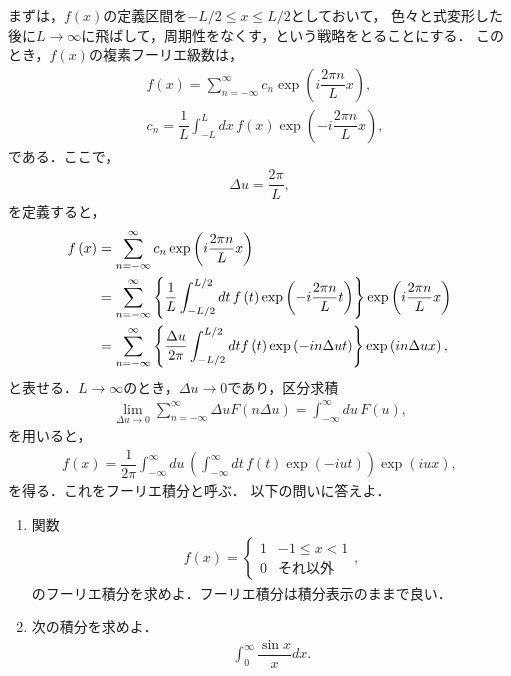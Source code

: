 まずは，$f(x)$の定義区間を$-L/2\leq x \leq L/2$としておいて，
色々と式変形した後に$L\to \infty$に飛ばして，周期性をなくす，という戦略をとることにする．
このとき，$f(x)$の複素フーリエ級数は，
\begin{align}
  &f\left(x\right) = \sum_{n=-\infty}^{\infty}c_n \exp\left(i\dfrac{2\pi n}{L}x\right), \\
  &c_n = \dfrac{1}{L}\int_{-L}^{L}dx\,f\left(x\right)\exp\left(-i\dfrac{2\pi n}{L}x\right),
\end{align}
である．ここで，
\begin{align}
  \Delta u = \dfrac{2\pi}{L},
\end{align}
を定義すると，
\begin{align}
 f\left(x\right) &= \sum_{n=-\infty}^{\infty}c_n \exp\left(i\dfrac{2\pi n}{L}x\right) \notag \\
                 &= \sum_{n=-\infty}^{\infty}\left\{\dfrac{1}{L}\int_{-L/2}^{L/2}dt\, f\left(t\right)
                             \exp\left(-i\dfrac{2\pi n}{L}t\right)\right\}\exp\left(i\dfrac{2\pi n}{L}x\right) \notag \\
                 &= \sum_{n=-\infty}^{\infty}\left\{\dfrac{\Delta u}{2\pi}\int_{-L/2}^{L/2}dt 
                        f\left(t\right)\exp\left(-in\Delta u t\right)\right\}\exp\left(in\Delta u x\right),
\end{align}
と表せる．$L\to \infty$のとき，$\Delta u \to 0$であり，区分求積
\begin{align}
 \lim_{\Delta u\to 0} \sum_{n=-\infty}^{\infty}\Delta u F\left(n\Delta u\right) = \int_{-\infty}^{\infty}du\,F\left(u\right),
\end{align}
を用いると，
\begin{align}
 f\left(x\right) = \dfrac{1}{2\pi}\int_{-\infty}^{\infty}du\,
                   \left(\int_{-\infty}^{\infty}dt\,f\left(t\right)\exp\left(-iut\right)\right)\exp\left(iux\right),
                   \label{fourier_integral}
\end{align}
を得る．これをフーリエ積分と呼ぶ．
%
\newpage
%
\gl
\reidai
以下の問いに答えよ．
\begin{enumerate}[(1)]
  \item 関数
	\begin{align}
	  f\left(x\right) =
	  \begin{cases}
	    1 & -1\leq x < 1 \\
	    0 & それ以外
	  \end{cases},
	\end{align}
	のフーリエ積分を求めよ．フーリエ積分は積分表示のままで良い．
  \item 次の積分を求めよ．
	\begin{align}
	  \int_0^{\infty}\dfrac{\sin x}{x}dx. 
	\end{align}
\end{enumerate}
\gl

